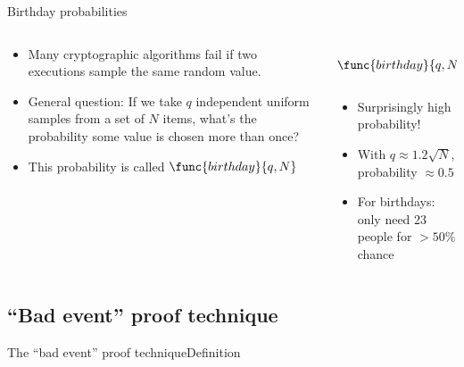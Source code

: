 \documentclass[aspectratio=169, lualatex, handout]{beamer}
\begin{document}
\begin{frame}{Birthday probabilities}
	\begin{columns}[c]
		\begin{column}{0.6\textwidth}
			\begin{itemize}
				\item Many cryptographic algorithms fail if two executions sample the same random value.
				\item General question: If we take $q$ independent uniform samples from a set of $N$ items, what's the probability some value is chosen more than once?
				\item This probability is called $\func{birthday}{q,N}$
			\end{itemize}
		\end{column}
		\begin{column}{0.4\textwidth}
			\begin{align*}
				\func{birthday}{q,N} = 1 - \prod_{i=1}^{q-1} \left(1 - \frac{i}{N}\right)
			\end{align*}
			\begin{itemize}
				\item Surprisingly high probability!
				\item With $q \approx 1.2\sqrt{N}$, probability $\approx 0.5$
				\item For birthdays: only need 23 people for $>50\%$ chance
			\end{itemize}
		\end{column}
	\end{columns}
\end{frame}

\subsection{``Bad event'' proof technique}

\begin{frame}{The ``bad event'' proof technique}{Definition}
\end{frame}
\end{document}
